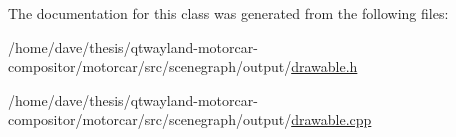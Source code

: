 The documentation for this class was generated from the following files\-:\begin{DoxyCompactItemize}
\item 
/home/dave/thesis/qtwayland-\/motorcar-\/compositor/motorcar/src/scenegraph/output/\hyperlink{drawable_8h}{drawable.\-h}\item 
/home/dave/thesis/qtwayland-\/motorcar-\/compositor/motorcar/src/scenegraph/output/\hyperlink{drawable_8cpp}{drawable.\-cpp}\end{DoxyCompactItemize}
